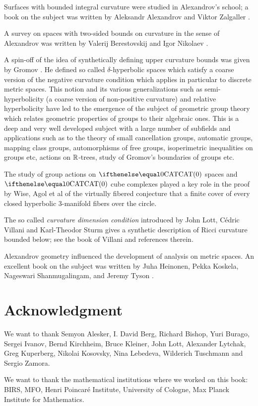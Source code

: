 Surfaces with bounded integral curvature were studied in Alexandrov's school;
a book on the subject was written by Aleksandr Alexandrov and Viktor Zalgaller \cite{aleksandrov-zalgaller}.

A survey on spaces with two-sided bounds on curvature in the sense of Alexandrov was written by Valerij Berestovskij and Igor Nikolaev \cite{berestovskii-nikolaev}.

A spin-off of the idea of synthetically defining upper curvature bounds 
was given by Gromov \cite{gromov:hyp-groups}. 
He  defined so called  $\delta$-hyperbolic spaces which satisfy   a coarse version of the  negative curvature condition which applies in particular to discrete metric spaces.
This notion and its various generalizations such as semi-hyperbolicity (a coarse version of non-positive curvature) and relative hyperbolicity have  led to the emergence of the subject of geometric group theory which relates geometric properties of groups to their algebraic ones. This is a deep and very well developed subject with a large number of subfields and applications such as to the theory  of small cancellation groups, automatic groups,  mapping class groups, automorphisms of free groups, isoperimetric inequalities on groups etc, actions on $\mathbb{R}$-trees, study of Gromov's boundaries of groups etc.

The study of group actions on $\CAT 0$ spaces and $\CAT 0$ cube complexes played a key role in the proof by Wise, Agol et al of the virtually fibered conjecture that a finite cover of  every closed hyperbolic 3-manifold fibers over the circle.

The so called \emph{curvature dimension condition} introduced by John Lott, C\'edric Villani and Karl-Theodor Sturm gives a synthetic description of Ricci curvature bounded below; see the book of Villani \cite{villani} and references therein.

Alexandrov geometry influenced the development of analysis on metric spaces. 
An excellent book on the subject was written by Juha Heinonen, Pekka Koskela, Nageswari Shanmugalingam, and Jeremy Tyson \cite{heinonen-koskela-shanmugalingam-tyson}.

\section*{Acknowledgment}
We want to thank 
Semyon Alesker,
I. David Berg,
Richard Bishop, 
Yuri Burago, 
Sergei Ivanov,
Bernd Kirchheim, 
Bruce Kleiner, 
John Lott,
Alexander Lytchak, 
Greg Kuperberg, 
Nikolai Kosovsky, 
Nina Lebedeva,
Wilderich Tuschmann and
Sergio Zamora.


We want to thank the mathematical institutions where we worked on this book:
BIRS, 
MFO, 
Henri Poincar\'{e} Institute,
University of Cologne, 
Max Planck Institute for Mathematics.



